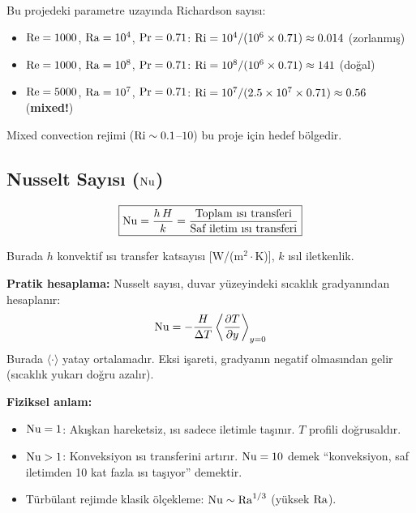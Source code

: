 \begin{example}
Bu projedeki parametre uzayında Richardson sayısı:
\begin{itemize}
    \item $\mathrm{Re} = 1000$, $\mathrm{Ra} = 10^4$, $\mathrm{Pr} = 0.71$: \; $\mathrm{Ri} = 10^4/(10^6 \times 0.71) \approx 0.014$ (zorlanmış)
    \item $\mathrm{Re} = 1000$, $\mathrm{Ra} = 10^8$, $\mathrm{Pr} = 0.71$: \; $\mathrm{Ri} = 10^8/(10^6 \times 0.71) \approx 141$ (doğal)
    \item $\mathrm{Re} = 5000$, $\mathrm{Ra} = 10^7$, $\mathrm{Pr} = 0.71$: \; $\mathrm{Ri} = 10^7/(2.5\times10^7 \times 0.71) \approx 0.56$ (\textbf{mixed!})
\end{itemize}
Mixed convection rejimi ($\mathrm{Ri} \sim 0.1$--$10$) bu proje için hedef bölgedir.
\end{example}


\subsection{Nusselt Sayısı ($\mathrm{Nu}$)}
\label{subsec:nusselt}

\begin{equation}
    \boxed{\mathrm{Nu} = \frac{h\,H}{k} = \frac{\text{Toplam ısı transferi}}{\text{Saf iletim ısı transferi}}}
    \label{eq:nusselt}
\end{equation}

Burada $h$ konvektif ısı transfer katsayısı [W/(m$^2\cdot$K)], $k$ ısıl iletkenlik.

\textbf{Pratik hesaplama:} Nusselt sayısı, duvar yüzeyindeki sıcaklık gradyanından hesaplanır:
\begin{equation}
    \mathrm{Nu} = -\frac{H}{\Delta T}\left\langle\frac{\partial T}{\partial y}\right\rangle_{y=0}
    \label{eq:nusselt_gradient}
\end{equation}
Burada $\langle\cdot\rangle$ yatay ortalamadır. Eksi işareti, gradyanın negatif olmasından gelir (sıcaklık yukarı doğru azalır).

\textbf{Fiziksel anlam:}
\begin{itemize}
    \item $\mathrm{Nu} = 1$: Akışkan hareketsiz, ısı sadece iletimle taşınır. $T$ profili doğrusaldır.
    \item $\mathrm{Nu} > 1$: Konveksiyon ısı transferini artırır. $\mathrm{Nu} = 10$ demek ``konveksiyon, saf iletimden 10 kat fazla ısı taşıyor'' demektir.
    \item Türbülant rejimde klasik ölçekleme: $\mathrm{Nu} \sim \mathrm{Ra}^{1/3}$ (yüksek $\mathrm{Ra}$).
\end{itemize}

